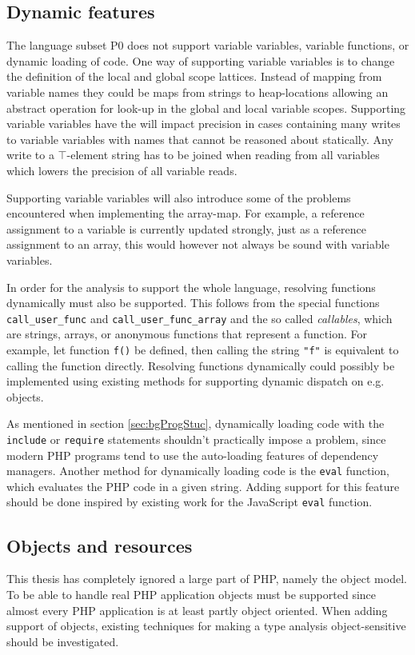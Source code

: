 \subsection{Dynamic features}
The language subset P0 does not support variable variables, variable functions, or dynamic loading of code. One way of supporting variable variables is to change the definition of the local and global scope lattices. Instead of mapping from variable names they could be maps from strings to heap-locations allowing an abstract operation for look-up in the global and local variable scopes. Supporting variable variables have the will impact precision in cases containing many writes to variable variables with names that cannot be reasoned about statically. Any write to a $\top$-element string has to be joined when reading from all variables which lowers the precision of all variable reads.

Supporting variable variables will also introduce some of the problems encountered when implementing the array-map. For example, a reference assignment to a variable is currently updated strongly, just as a reference assignment to an array, this would however not always be sound with variable variables.

In order for the analysis to support the whole language, resolving functions dynamically must also be supported. This follows from the special functions \texttt{call\_user\_func} and \texttt{call\_user\_func\_array} and the so called \emph{callables}, which are strings, arrays, or anonymous functions that represent a function. For example, let function \texttt{f()} be defined, then calling the string \texttt{"f"} is equivalent to calling the function directly. Resolving functions dynamically could possibly be implemented using existing methods for supporting dynamic dispatch on e.g. objects.

As mentioned in section \ref{sec:bgProgStuc}, dynamically loading code with the \texttt{include} or \texttt{require} statements shouldn't practically impose a problem, since modern PHP programs tend to use the auto-loading features of dependency managers. Another method for dynamically loading code is the \texttt{eval} function, which evaluates the PHP code in a given string. Adding support for this feature should be done inspired by existing work for the JavaScript \texttt{eval} function.

\subsection{Objects and resources}	
This thesis has completely ignored a large part of PHP, namely the object model. To be able to handle real PHP application objects must be supported since almost every PHP application is at least partly object oriented. When adding support of objects, existing techniques for making a type analysis object-sensitive should be investigated. 


